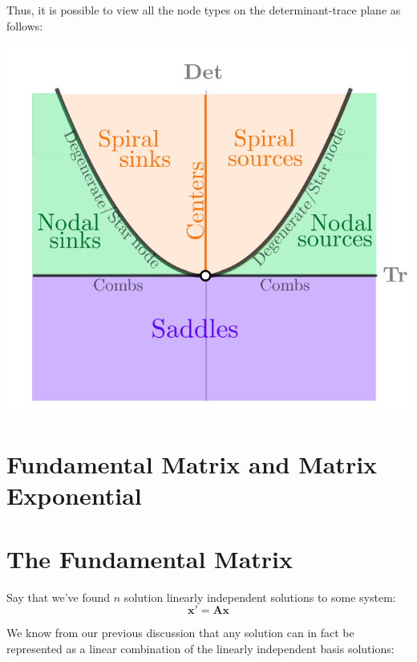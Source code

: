 \documentclass{report}
\begin{document}
Thus, it is possible to view all the node types on the determinant-trace plane as follows:

\includegraphics[scale=0.5]{trace_det_full.png}



























\section{Fundamental Matrix and Matrix Exponential}

\section{The Fundamental Matrix}
Say that we've found $n$ solution linearly independent solutions to some system:
$$\mathbf{x'} = \mathbf{Ax}$$


We know from our previous discussion that any solution can in fact be represented as a linear combination of the linearly independent basis solutions:
\end{document}
